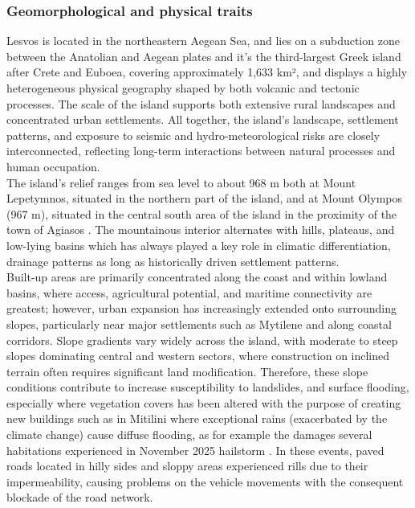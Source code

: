 \documentclass[10pt, twocolumn, twoside]{article}
\begin{document}
\subsubsection{Geomorphological and physical traits 
}
Lesvos is located in the northeastern Aegean Sea, and lies on a subduction zone between the Anatolian and Aegean plates and it's the third-largest Greek island after Crete and Euboea, covering approximately 1,633 km², and displays a highly heterogeneous physical geography shaped by both volcanic and tectonic processes\cite{BritannicaGreekMythology}. The scale of the island supports both extensive rural landscapes and concentrated urban settlements. All together, the island’s landscape, settlement patterns, and exposure to seismic and hydro-meteorological risks are closely interconnected, reflecting long-term interactions between natural processes and human occupation.\\
The island’s relief ranges from sea level to about 968 m both at Mount Lepetymnos, situated in the northern part of the island, and at Mount Olympos (967 m), situated in the central south area of the island in the proximity of the town of Agiasos \cite{BritannicaGreekMythology}. The mountainous interior alternates with hills, plateaus, and low-lying basins which has always played a key role in climatic differentiation, drainage patterns as long as historically driven settlement patterns. \\
Built-up areas are primarily concentrated along the coast and within lowland basins, where access, agricultural potential, and maritime connectivity are greatest; however, urban expansion has increasingly extended onto surrounding slopes, particularly near major settlements such as Mytilene and along coastal corridors. Slope gradients vary widely across the island, with moderate to steep slopes dominating central and western sectors, where construction on inclined terrain often requires significant land modification. Therefore, these slope conditions contribute to increase susceptibility to landslides, and surface flooding, especially where vegetation covers has been altered with the purpose of creating new buildings such as in Mitilini where exceptional rains (exacerbated by the climate change) cause diffuse flooding, as for example the damages several habitations experienced in November 2025 hailstorm \cite{protema}. In these events, paved roads located in hilly sides and sloppy areas experienced rills due to their impermeability, causing problems on the vehicle movements with the consequent blockade of the road network.\\\\
\end{document}
